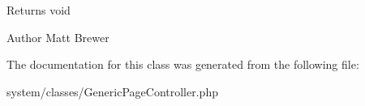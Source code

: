 \begin{DoxyReturn}{Returns}
void 
\end{DoxyReturn}
\begin{DoxyAuthor}{Author}
Matt Brewer 
\end{DoxyAuthor}


The documentation for this class was generated from the following file:\begin{DoxyCompactItemize}
\item 
system/classes/GenericPageController.php\end{DoxyCompactItemize}

